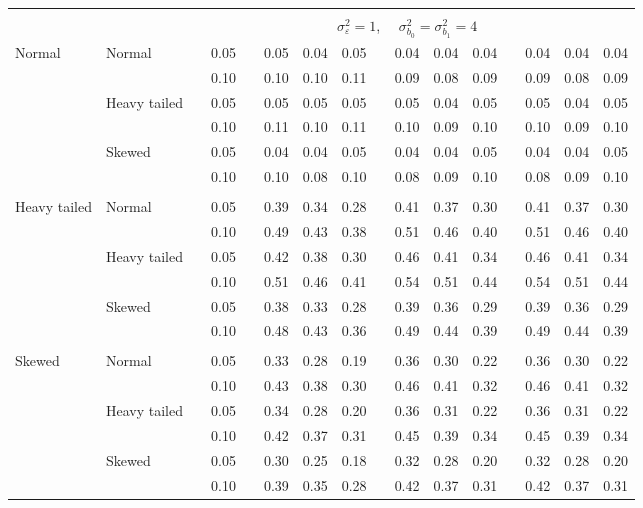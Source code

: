 \documentclass{article} %
\begin{document}
\begin{table}[ht]
\begin{scriptsize}
\begin{center}
\begin{tabular}{ll p{.1cm} c p{.1cm} rrr p{.1cm} rrr p{.1cm} rrr}
&&&&&&&&&&&&&&&\\
& && && \multicolumn{9}{c}{$\sigma_{\varepsilon}^2 = 1$, \ \ $\sigma_{b_0}^2 = \sigma_{b_1}^2 = 4$} \\ \cline{6-16}
\rowcolor{gray!20}Normal       & Normal       && 0.05 &&   0.05 & 0.04 & 0.05 && 0.04 & 0.04 & 0.04 && 0.04 & 0.04 & 0.04 \\ 
\rowcolor{gray!20}             &              && 0.10 &&   0.10 & 0.10 & 0.11 && 0.09 & 0.08 & 0.09 && 0.09 & 0.08 & 0.09 \\ 
\rowcolor{gray!20}             & Heavy tailed && 0.05 &&   0.05 & 0.05 & 0.05 && 0.05 & 0.04 & 0.05 && 0.05 & 0.04 & 0.05 \\ 
\rowcolor{gray!20}             &              && 0.10 &&   0.11 & 0.10 & 0.11 && 0.10 & 0.09 & 0.10 && 0.10 & 0.09 & 0.10 \\ 
\rowcolor{gray!20}             & Skewed       && 0.05 &&   0.04 & 0.04 & 0.05 && 0.04 & 0.04 & 0.05 && 0.04 & 0.04 & 0.05 \\ 
\rowcolor{gray!20}             &              && 0.10 &&   0.10 & 0.08 & 0.10 && 0.08 & 0.09 & 0.10 && 0.08 & 0.09 & 0.10 \\ 
             &&&&&&&&&&&&&&&\\
Heavy tailed & Normal       && 0.05 &&   0.39 & 0.34 & 0.28 && 0.41 & 0.37 & 0.30 && 0.41 & 0.37 & 0.30 \\ 
             &              && 0.10 &&   0.49 & 0.43 & 0.38 && 0.51 & 0.46 & 0.40 && 0.51 & 0.46 & 0.40 \\ 
             & Heavy tailed && 0.05 &&   0.42 & 0.38 & 0.30 && 0.46 & 0.41 & 0.34 && 0.46 & 0.41 & 0.34 \\ 
             &              && 0.10 &&   0.51 & 0.46 & 0.41 && 0.54 & 0.51 & 0.44 && 0.54 & 0.51 & 0.44 \\ 
             & Skewed       && 0.05 &&   0.38 & 0.33 & 0.28 && 0.39 & 0.36 & 0.29 && 0.39 & 0.36 & 0.29 \\ 
             &              && 0.10 &&   0.48 & 0.43 & 0.36 && 0.49 & 0.44 & 0.39 && 0.49 & 0.44 & 0.39 \\ 
             &&&&&&&&&&&&&&&\\
Skewed       & Normal       && 0.05 &&   0.33 & 0.28 & 0.19 && 0.36 & 0.30 & 0.22 && 0.36 & 0.30 & 0.22 \\ 
             &              && 0.10 &&   0.43 & 0.38 & 0.30 && 0.46 & 0.41 & 0.32 && 0.46 & 0.41 & 0.32 \\ 
             & Heavy tailed && 0.05 &&   0.34 & 0.28 & 0.20 && 0.36 & 0.31 & 0.22 && 0.36 & 0.31 & 0.22 \\ 
             &              && 0.10 &&   0.42 & 0.37 & 0.31 && 0.45 & 0.39 & 0.34 && 0.45 & 0.39 & 0.34 \\ 
             & Skewed       && 0.05 &&   0.30 & 0.25 & 0.18 && 0.32 & 0.28 & 0.20 && 0.32 & 0.28 & 0.20 \\ 
             &              && 0.10 &&   0.39 & 0.35 & 0.28 && 0.42 & 0.37 & 0.31 && 0.42 & 0.37 & 0.31 \\ 



\end{tabular}
\end{center}
\end{scriptsize}
\end{table}
\end{document}
